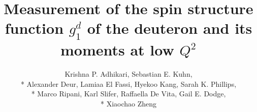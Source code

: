 \documentclass[12pt,epsfig]{report}
\begin{document}
\title{Measurement of the spin structure function $g^d_{1}$ of the deuteron and its moments at low $Q^2$}   
\author{Krishna P. Adhikari, Sebastian E. Kuhn, \\*
Alexander Deur, Lamiaa El Fassi, Hyekoo Kang, Sarah K. Phillips, \\* %
Marco Ripani, Karl Slifer, Raffaella De Vita, Gail E. Dodge, \\*
 Xiaochao Zheng}

\maketitle

\begin{comment} %
\end{comment} %


\tableofcontents
\begin{comment} %
\listoffigures
\listoftables
\end{comment} %



%












\begin{comment} %







\end{comment} %



\begin{comment} %


\end{comment} %
\end{document}
